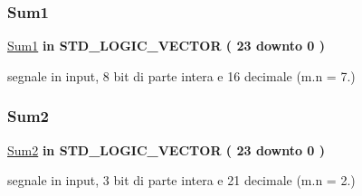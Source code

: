 \mbox{\label{group___linear_regression_ga43a9a0da4f44006af5631ed5ee8ad924}} 
\subsubsection{\texorpdfstring{Sum1}{Sum1}}
{\footnotesize\ttfamily \hyperlink{group___linear_regression_ga43a9a0da4f44006af5631ed5ee8ad924}{Sum1} {\bfseries \textcolor{vhdlchar}{in}\textcolor{vhdlchar}{ }} {\bfseries \textcolor{vhdlchar}{S\+T\+D\+\_\+\+L\+O\+G\+I\+C\+\_\+\+V\+E\+C\+T\+OR}\textcolor{vhdlchar}{ }\textcolor{vhdlchar}{(}\textcolor{vhdlchar}{ }\textcolor{vhdlchar}{ } \textcolor{vhdldigit}{23} \textcolor{vhdlchar}{ }\textcolor{vhdlchar}{downto}\textcolor{vhdlchar}{ }\textcolor{vhdlchar}{ } \textcolor{vhdldigit}{0} \textcolor{vhdlchar}{ }\textcolor{vhdlchar}{)}\textcolor{vhdlchar}{ }} \hspace{0.3cm}{\ttfamily [Port]}}



segnale in input, 8 bit di parte intera e 16 decimale (m.\+n = 7.) 

\mbox{\label{group___linear_regression_ga4c98819455589b84c5e250a97e9bdfa1}} 
\subsubsection{\texorpdfstring{Sum2}{Sum2}}
{\footnotesize\ttfamily \hyperlink{group___linear_regression_ga4c98819455589b84c5e250a97e9bdfa1}{Sum2} {\bfseries \textcolor{vhdlchar}{in}\textcolor{vhdlchar}{ }} {\bfseries \textcolor{vhdlchar}{S\+T\+D\+\_\+\+L\+O\+G\+I\+C\+\_\+\+V\+E\+C\+T\+OR}\textcolor{vhdlchar}{ }\textcolor{vhdlchar}{(}\textcolor{vhdlchar}{ }\textcolor{vhdlchar}{ } \textcolor{vhdldigit}{23} \textcolor{vhdlchar}{ }\textcolor{vhdlchar}{downto}\textcolor{vhdlchar}{ }\textcolor{vhdlchar}{ } \textcolor{vhdldigit}{0} \textcolor{vhdlchar}{ }\textcolor{vhdlchar}{)}\textcolor{vhdlchar}{ }} \hspace{0.3cm}{\ttfamily [Port]}}



segnale in input, 3 bit di parte intera e 21 decimale (m.\+n = 2.) 

